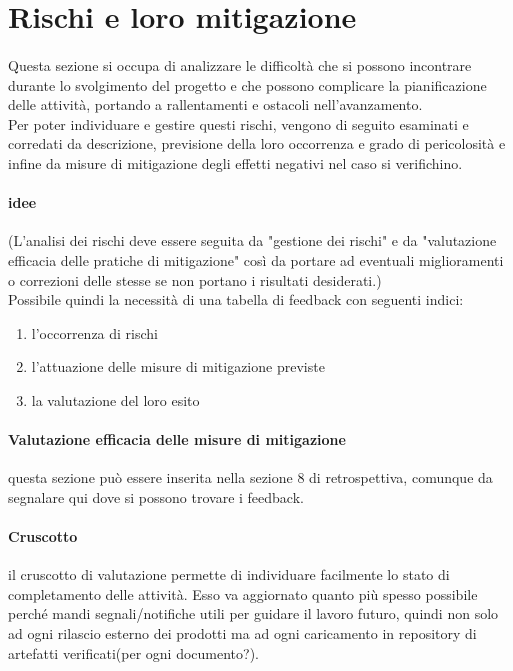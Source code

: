 \documentclass[10pt, a4paper]{article}
\begin{document}
\section{Rischi e loro mitigazione}
\paragraph{}Questa sezione si occupa di analizzare le difficoltà che si possono incontrare durante lo svolgimento del progetto e che possono complicare la pianificazione delle attività, portando a rallentamenti e ostacoli nell'avanzamento.\\
Per poter individuare e gestire questi rischi, vengono di seguito esaminati e corredati da descrizione, previsione della loro occorrenza e grado di pericolosità e infine da misure di mitigazione degli effetti negativi nel caso si verifichino.

\color{gray}\paragraph{ idee} (L'analisi dei rischi deve essere seguita da "gestione dei rischi" e da "valutazione efficacia delle pratiche di mitigazione" così da portare ad eventuali miglioramenti o correzioni delle stesse se non portano i risultati desiderati.)\\
Possibile quindi la necessità di una tabella di feedback con seguenti indici:
\begin{enumerate}
    \item l’occorrenza di rischi
    \item l’attuazione delle misure di mitigazione previste
    \item la valutazione del loro esito
\end{enumerate}
   
\paragraph{Valutazione efficacia delle misure di mitigazione} questa sezione può essere inserita nella sezione 8 di retrospettiva, comunque da segnalare qui dove si possono trovare i feedback.
\paragraph{Cruscotto} il cruscotto di valutazione permette di individuare
facilmente lo stato di completamento delle attività. Esso va aggiornato quanto più spesso possibile perché mandi segnali/notifiche utili per guidare il lavoro futuro, quindi non solo ad ogni rilascio esterno dei prodotti ma ad ogni caricamento in repository di artefatti verificati(per ogni documento?).\\
\color{black}
\end{document}
